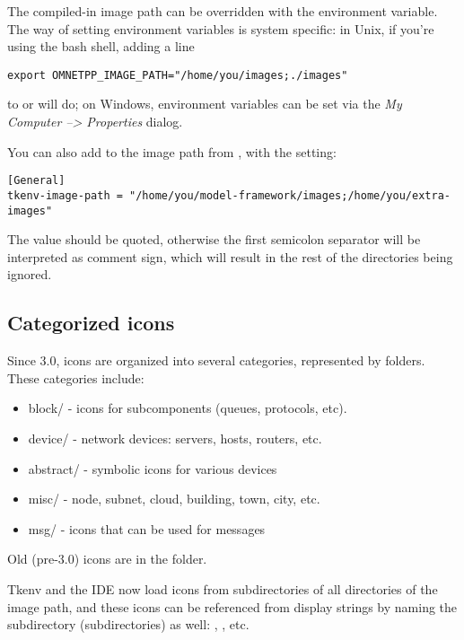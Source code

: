 The compiled-in image path can be overridden with the 
environment variable. The way of setting environment variables is system
specific: in Unix, if you're using the bash shell, adding a line

\begin{verbatim}
export OMNETPP_IMAGE_PATH="/home/you/images;./images"
\end{verbatim}

to  or  will do; on Windows, environment variables
can be set via the \textit{My Computer --> Properties} dialog.

You can also add to the image path from , with
the  setting:

\begin{verbatim}
[General]
tkenv-image-path = "/home/you/model-framework/images;/home/you/extra-images"
\end{verbatim}

The value should be quoted, otherwise the first semicolon separator will be
interpreted as comment sign, which will result in the rest of the
directories being ignored.


\subsection{Categorized icons}

Since {\opp} 3.0, icons are organized into several categories, represented
by folders. These categories include:

\begin{itemize}
  \item block/ - icons for subcomponents (queues, protocols, etc).
  \item device/ - network devices: servers, hosts, routers, etc.
  \item abstract/ - symbolic icons for various devices
  \item misc/ - node, subnet, cloud, building, town, city, etc.
  \item msg/ - icons that can be used for messages
\end{itemize}

Old (pre-3.0) icons are in the  folder.

Tkenv and the IDE now load icons from subdirectories of all directories
of the image path, and these icons can be referenced from display strings
by naming the subdirectory (subdirectories) as well:
, , etc.

